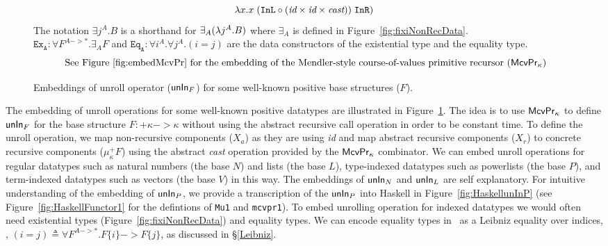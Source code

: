 {\begin{landscape}
\begin{figure}
\[\lambda x. x \;(\texttt{InL}\circ
		(\textit{id}\times\textit{id}\times\textit{cast}))
	\;\texttt{InR})
\]
The notation $\exists j^A.B$ is a shorthand for $\exists_A(\lambda j^A.B)$
where $\exists_A$ is defined in Figure~\ref{fig:fixiNonRecData}.\\
$\mathtt{Ex_{A}} : \forall F^{A -> *}.\exists_A F$ and
$\mathtt{Eq_{A}} : \forall i^A.\forall j^A.(i=j)$ are
the data constructors of the existential type and the equality type.
\[\text{
See Figure \ref{fig:embedMcvPr} for the embedding of the Mendler-style
course-of-values primitive recursor ($\mathsf{McvPr}_\kappa$)}
\]
\caption{Embeddings of unroll operator ($\mathsf{unIn}_F$)
	for some well-known positive base structures ($F$).}
\label{fig:unInExamples}
\end{figure}

\end{landscape}
} %

The embedding of unroll operations for some well-known positive datatypes
are illustrated in Figure~\ref{fig:unInExamples}. The idea is to use
$\mathsf{McvPr}_\kappa$ to define $\mathsf{unIn}_F$ for the base structure
$F:+\kappa -> \kappa$ without using the abstract recursive call operation
in order to be constant time. To define the unroll operation, we map
non-recursive components ($X_a$) as they are using \textit{id} and map
abstract recursive components ($X_r$) to concrete recursive components
($\mu^{+}_\kappa F$) using the abstract \textit{cast} operation provided
by the $\mathsf{McvPr}_\kappa$ combinator. We can embed unroll operations
for regular datatypes such as natural numbers (the base $N$) and lists
(the base $L$), type-indexed datatypes such as powerlists (the base $P$),
and term-indexed datatypes such as vectors (the base $V$) in this way.
The embeddings of $\mathsf{unIn}_N$ and $\mathsf{unIn}_L$ are self explanatory.
For intuitive understanding of the embedding of $\mathsf{unIn}_P$, we provide
a transcription of the $\mathsf{unIn}_P$ into Haskell in Figure~\ref{fig:HaskellunInP}
(see Figure~\ref{fig:HaskellFunctor1} for the defintions of \texttt{Mu1} and
\texttt{mcvpr1}). To embed unrolling operation for indexed datatypes we would
often need existential types (Figure~\ref{fig:fixiNonRecData}) and
equality types. We can encode equality types in \Fixi\ as a Leibniz equality
over indices, \ie, $(i=j) \triangleq \forall F^{A -> *}.F\{i\} -> F\{j\}$,
as discussed in \S\ref{Leibniz}.


